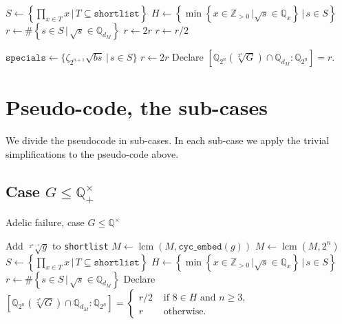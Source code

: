 \documentclass[10pt,a4paper]{report}
\DeclareMathOperator{\lcm}{lcm}
\theoremstyle{definition}
\begin{document}
\begin{algorithm}
\begin{algorithmic}
\State $S\leftarrow\left\{\prod_{x\in T}x\,|\,T\subseteq\texttt{shortlist}\right\}$
\State $H\leftarrow\left\{\min\left\{x\in\mathbb{Z}_{>0}\,|\sqrt{s}\in \mathbb{Q}_x\right\}\,|\,s\in S\right\}$
\State $r\leftarrow\# \left\{s\in S\,|\, \sqrt{s}\in\mathbb{Q}_{d_M}\right\}$
\State
{}
\State $r\leftarrow 2r$
\EndIf
\State
{}
\State $r\leftarrow r/2$
\EndIf
\State

\State $\texttt{specials}\leftarrow\{\zeta_{2^{n+1}}\sqrt{bs}\,|\,s\in S\}$
\State $r\leftarrow 2r$
\EndIf
\EndIf
\State
\State Declare $\left[\mathbb{Q}_{2^n}\left(\sqrt[2^n]{G}\right)\cap \mathbb{Q}_{d_M}:\mathbb{Q}_{2^n}\right]=r$.

\EndFor
\EndFor
\end{algorithmic}
\end{algorithm}

\pagebreak

\section*{Pseudo-code, the sub-cases}

We divide the pseudocode in sub-cases. In each sub-case we apply the trivial simplifications to the pseudo-code above.

\subsection*{Case $G\leq \mathbb{Q}_+^\times$}

\begin{algorithm}
\caption{Adelic failure, case $G\leq \mathbb{Q}^\times$}

\begin{algorithmic}
\State Add $\sqrt[2^{n-1}]{g}$ to \texttt{shortlist}
\State $M\leftarrow\lcm(M,\texttt{cyc\_embed}(g))$
\EndFor
\State
\State $M\leftarrow\lcm(M,2^n)$
\State
{}
\State $S\leftarrow\left\{\prod_{x\in T}x\,|\,T\subseteq\texttt{shortlist}\right\}$
\State $H\leftarrow\left\{\min\left\{x\in\mathbb{Z}_{>0}\,|\sqrt{s}\in \mathbb{Q}_x\right\}\,|\,s\in S\right\}$
\State $r\leftarrow\# \left\{s\in S\,|\, \sqrt{s}\in\mathbb{Q}_{d_M}\right\}$
\State Declare $\left[\mathbb{Q}_{2^n}\left(\sqrt[2^n]{G}\right)\cap \mathbb{Q}_{d_M}:\mathbb{Q}_{2^n}\right]=\begin{cases}
r/2&\text{ if }8\in H\text{ and }n\geq 3,\\
r&\text{ otherwise}.
\end{cases}$
\EndFor
\EndFor
\end{algorithmic}

\end{algorithm}
\pagebreak
\end{document}
